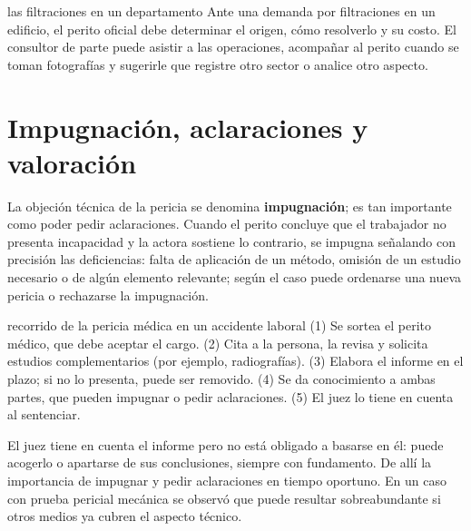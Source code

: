 \documentclass[12pt,oneside]{book}
\begin{document}
\begin{ejemplo}{las filtraciones en un departamento}
Ante una demanda por filtraciones en un edificio, el perito oficial debe determinar el origen, cómo resolverlo y su costo. El consultor de parte puede asistir a las operaciones, acompañar al perito cuando se toman fotografías y sugerirle que registre otro sector o analice otro aspecto.
\end{ejemplo}

\section{Impugnación, aclaraciones y valoración}

La objeción técnica de la pericia se denomina \textbf{impugnación}; es tan importante como poder pedir aclaraciones. Cuando el perito concluye que el trabajador no presenta incapacidad y la actora sostiene lo contrario, se impugna señalando con precisión las deficiencias: falta de aplicación de un método, omisión de un estudio necesario o de algún elemento relevante; según el caso puede ordenarse una nueva pericia o rechazarse la impugnación.

\begin{ejemplo}{recorrido de la pericia médica en un accidente laboral}
(1) Se sortea el perito médico, que debe aceptar el cargo. (2) Cita a la persona, la revisa y solicita estudios complementarios (por ejemplo, radiografías). (3) Elabora el informe en el plazo; si no lo presenta, puede ser removido. (4) Se da conocimiento a ambas partes, que pueden impugnar o pedir aclaraciones. (5) El juez lo tiene en cuenta al sentenciar.
\end{ejemplo}

\begin{importante}
El juez tiene en cuenta el informe pero no está obligado a basarse en él: puede acogerlo o apartarse de sus conclusiones, siempre con fundamento. De allí la importancia de impugnar y pedir aclaraciones en tiempo oportuno. En un caso con prueba pericial mecánica se observó que puede resultar sobreabundante si otros medios ya cubren el aspecto técnico.
\end{importante}
\end{document}

